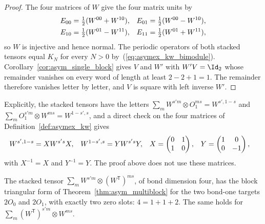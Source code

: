 \begin{proof}
    \leanok
    The four matrices of $W$ give the four matrix units by
    \begin{align}
        E_{00} & =\tfrac12(W^{00}+W^{10}),
               &
        E_{01} & =\tfrac12(W^{00}-W^{10}),
        \notag                             \\
        E_{10} & =\tfrac12(W^{01}-W^{11}),
               &
        E_{11} & =\tfrac12(W^{01}+W^{11}),
        \notag
    \end{align}
    so $W$ is injective and hence normal. The
    periodic operators of both stacked tensors equal $K_N$ for every
    $N>0$ by~(\ref{eq:asymex_kw_bimodule}). Corollary~\ref{cor:asym_single_block}
    gives $V$ and $W'$ with $W'V=\Id_2$ whose remainder vanishes on every
    word of length at least $2-2+1=1$. The remainder therefore vanishes
    letter by letter, and $V$ is square with left inverse $W'$.
\end{proof}

Explicitly, the stacked tensors have the letters
$\sum_mW^{s'm}\otimes O_1^{ms}=W^{s',1-s}$ and
$\sum_mO_1^{s'm}\otimes W^{ms}=W^{1-s',s}$, and a direct check on the
four matrices of Definition~\ref{def:asymex_kw} gives
\begin{align}
    W^{s',1-s} & =XW^{s's}X,
               &
    W^{1-s',s} & =YW^{s's}Y,
               &
    X          & =\begin{pmatrix}0&1\\1&0\end{pmatrix},
               &
    Y          & =\begin{pmatrix}1&0\\0&-1\end{pmatrix},
    \notag
\end{align}
with $X^{-1}=X$ and $Y^{-1}=Y$. The proof above does not use these
matrices.

\begin{lemma}
    \label{thm:asymex_kw_bimodule_fusion}
    \leanok
    The stacked tensor $\sum_mW^{s'm}\otimes(W^{\mathsf T})^{ms}$, of
    bond dimension four, has the block triangular form of
    Theorem~\ref{thm:asym_multiblock} for the two bond-one targets
    $2O_0$ and $2O_1$, with exactly two zero slots: $4=1+1+2$. The same
    holds for $\sum_m(W^{\mathsf T})^{s'm}\otimes W^{ms}$.
\end{lemma}

